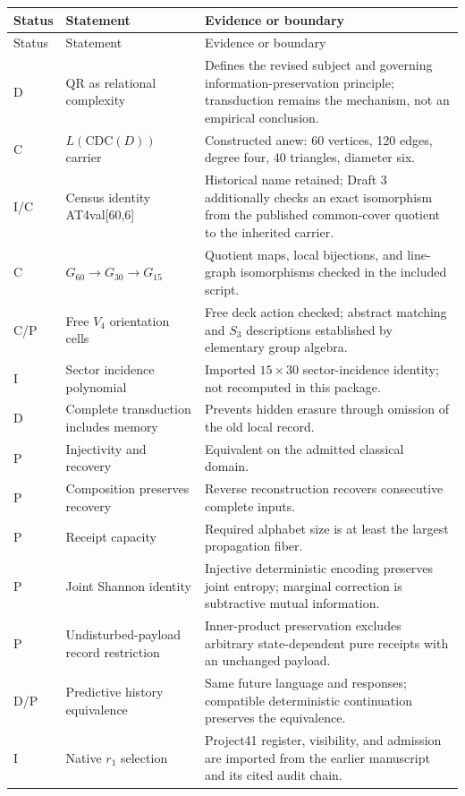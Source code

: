 \small
\begin{longtable}{@{}p{}p{}p{}@{}}
\toprule
Status & Statement & Evidence or boundary \\
\midrule
\endfirsthead
\toprule Status & Statement & Evidence or boundary \\
\midrule
\endhead
D & QR as relational complexity & Defines the revised subject and governing information-preservation principle; transduction remains the mechanism, not an empirical conclusion. \\
C & $L(\mathrm{CDC}(D))$ carrier & Constructed anew: 60 vertices, 120 edges, degree four, 40 triangles, diameter six. \\
I/C & Census identity AT4val[60,6] & Historical name retained; Draft 3 additionally checks an exact isomorphism from the published common-cover quotient to the inherited carrier. \\
C & $G_{60}\to G_{30}\to G_{15}$ & Quotient maps, local bijections, and line-graph isomorphisms checked in the included script. \\
C/P & Free $V_4$ orientation cells & Free deck action checked; abstract matching and $S_3$ descriptions established by elementary group algebra. \\
I & Sector incidence polynomial & Imported $15\times30$ sector-incidence identity; not recomputed in this package. \\
D & Complete transduction includes memory & Prevents hidden erasure through omission of the old local record. \\
P & Injectivity and recovery & Equivalent on the admitted classical domain. \\
P & Composition preserves recovery & Reverse reconstruction recovers consecutive complete inputs. \\
P & Receipt capacity & Required alphabet size is at least the largest propagation fiber. \\
P & Joint Shannon identity & Injective deterministic encoding preserves joint entropy; marginal correction is subtractive mutual information. \\
P & Undisturbed-payload record restriction & Inner-product preservation excludes arbitrary state-dependent pure receipts with an unchanged payload. \\
D/P & Predictive history equivalence & Same future language and responses; compatible deterministic continuation preserves the equivalence. \\
I & Native $r_1$ selection & Project41 register, visibility, and admission are imported from the earlier manuscript and its cited audit chain. \\

\end{longtable}
